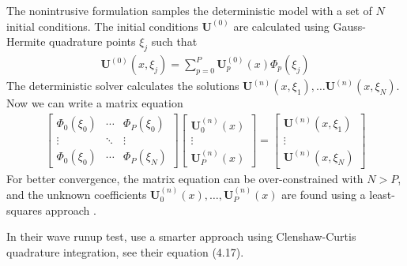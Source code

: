 \documentclass{article}
\newcommand{\vect}{\mathbf}
\begin{document}
The nonintrusive formulation samples the deterministic model with a set of $N$ initial conditions.
The initial conditions $\vect{U}^{(0)}$ are calculated using Gauss-Hermite quadrature points $\xi_j$ such that
\begin{align}
	\vect{U}^{(0)}(x, \xi_j) = \sum_{p=0}^P \vect{U}_p^{(0)}(x) \Phi_p(\xi_j)
\end{align}
The deterministic solver calculates the solutions $\vect{U}^{(n)}(x, \xi_1), \ldots \vect{U}^{(n)}(x, \xi_N)$.
Now we can write a matrix equation
\begin{align}
	\begin{bmatrix}
		\Phi_0(\xi_0) & \cdots & \Phi_P(\xi_0) \\
		\vdots & \ddots & \vdots \\
		\Phi_0(\xi_0) & \cdots & \Phi_P(\xi_N)
	\end{bmatrix}
	\begin{bmatrix}
		\vect{U}_0^{(n)}(x) \\
		\vdots \\
		\vect{U}_P^{(n)}(x)
	\end{bmatrix}
	=
	\begin{bmatrix}
		\vect{U}^{(n)}(x, \xi_1) \\
		\vdots \\
		\vect{U}^{(n)}(x, \xi_N)
	\end{bmatrix}
\end{align}
For better convergence, the matrix equation can be over-constrained with $N > P$, and the unknown coefficients $\vect{U}_0^{(n)}(x), \ldots, \vect{U}_P^{(n)}(x)$ are found using a least-squares approach \citep{hosder2007}.

In their wave runup test, \citet{ge2009} use a smarter approach using Clenshaw-Curtis quadrature integration, see their equation (4.17).



\end{document}
